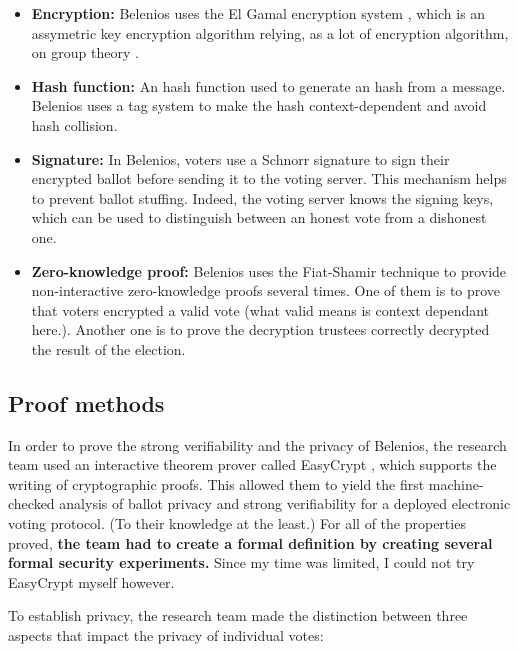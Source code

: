 \documentclass[12pt, a4paper]{report}
\begin{document}
\begin{itemize}
\item \textbf{Encryption:} Belenios uses the El Gamal encryption system \cite{WEBSITE:2}, which is an assymetric key encryption algorithm relying, as a lot of encryption algorithm, on group theory \cite{WEBSITE:3}.

\item \textbf{Hash function:} An hash function used to generate an hash from a message. Belenios uses a tag system to make the hash context-dependent and avoid hash collision.

\item \textbf{Signature:} In Belenios, voters use a Schnorr signature \cite{WEBSITE:4} to sign their encrypted ballot before sending it to the voting server. This mechanism helps to prevent ballot stuffing. \cite{BOOK:1} Indeed, the voting server knows the signing keys, which can be used to distinguish between an honest vote from a dishonest one.

\item \textbf{Zero-knowledge proof:} Belenios uses the Fiat-Shamir technique \cite{WEBSITE:5} to provide non-interactive zero-knowledge proofs several times. One of them is to prove that voters encrypted a valid vote (what valid  means is context dependant here.). Another one is to prove the decryption trustees correctly decrypted the result of the election. 
\end{itemize}

\subsection{Proof methods}

In order to prove the strong verifiability and the privacy of Belenios, the research team used an interactive theorem prover called EasyCrypt \cite{WEBSITE:6}, which supports the writing of cryptographic proofs.
This allowed them to yield the first machine-checked analysis of ballot privacy and strong verifiability for a deployed electronic voting protocol. \cite{BOOK:2} (To their knowledge at the least.) For all of the properties proved, \textbf{the team had to create a formal definition by creating several formal security experiments.} Since my time was limited, I could not try EasyCrypt myself however.

To establish privacy, the research team made the distinction between three aspects that impact the privacy of individual votes: \cite{BOOK:2}
\end{document}
